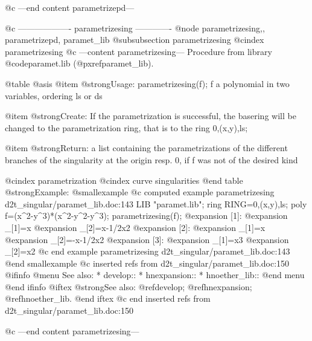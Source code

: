 @c ---end content parametrizepd---

@c ------------------- parametrizesing -------------
@node parametrizesing,, parametrizepd, paramet_lib
@subsubsection parametrizesing
@cindex parametrizesing
@c ---content parametrizesing---
Procedure from library @code{paramet.lib} (@pxref{paramet_lib}).

@table @asis
@item @strong{Usage:}
parametrizesing(f); f a polynomial in two variables, ordering ls or ds

@item @strong{Create:}
If the parametrization is successful, the basering will be changed to
the parametrization ring, that is to the ring 0,(x,y),ls;

@item @strong{Return:}
a list containing the parametrizations of the different branches of the
singularity at the origin resp. 0, if f was not of the desired kind

@cindex parametrization
@cindex curve singularities
@end table
@strong{Example:}
@smallexample
@c computed example parametrizesing d2t_singular/paramet_lib.doc:143 
LIB "paramet.lib";
ring RING=0,(x,y),ls;
poly f=(x^2-y^3)*(x^2-y^2-y^3);
parametrizesing(f);
@expansion{} [1]:
@expansion{}    _[1]=x
@expansion{}    _[2]=x-1/2x2
@expansion{} [2]:
@expansion{}    _[1]=x
@expansion{}    _[2]=-x-1/2x2
@expansion{} [3]:
@expansion{}    _[1]=x3
@expansion{}    _[2]=x2
@c end example parametrizesing d2t_singular/paramet_lib.doc:143
@end smallexample
@c inserted refs from d2t_singular/paramet_lib.doc:150
@ifinfo
@menu
See also:
* develop::
* hnexpansion::
* hnoether_lib::
@end menu
@end ifinfo
@iftex
@strong{See also:}
@ref{develop};
@ref{hnexpansion};
@ref{hnoether_lib}.
@end iftex
@c end inserted refs from d2t_singular/paramet_lib.doc:150

@c ---end content parametrizesing---
